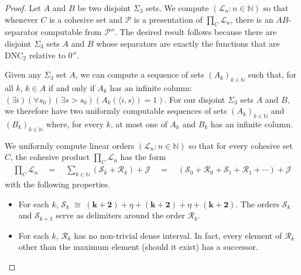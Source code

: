 \documentclass[11pt,a4paper,reqno]{amsart}
\theoremstyle{definition}
\newcommand{\dnc}{\mathrm{DNC}}
\newcommand{\la}{\langle}
\newcommand{\ra}{\rangle}
\newcommand{\iso}{\cong}
\newcommand{\Nb}{\mathbb{N}}
\newcommand{\mc}[1]{\mathcal{#1}}
\begin{document}
\begin{proof}
Let $A$ and $B$ be two disjoint $\Sigma_3$ sets.  We compute $(\mc{L}_n : n \in \Nb)$ so that whenever $C$ is a cohesive set and $\mc{P}$ is a presentation of $\prod_C \mc{L}_n$, there is an $AB$-separator computable from $\mc{P}''$.  The desired result follows because there are disjoint $\Sigma_3$ sets $A$ and $B$ whose separators are exactly the functions that are $\dnc_2$ relative to $0''$.

Given any $\Sigma_3$ set $A$, we can compute a sequence of sets $(A_k)_{k \in \Nb}$ such that, for all $k$, $k \in A$ if and only if $A_k$ has an infinite column: $(\exists i)(\forall s_0)(\exists s > s_0)(A_k(\la i, s \ra) = 1)$. 
For our disjoint $\Sigma_3$ sets $A$ and $B$, we therefore have two uniformly computable sequences of sets $(A_k)_{k \in \Nb}$ and $(B_k)_{k \in \Nb}$ where, for every $k$, at most one of $A_k$ and $B_k$ has an infinite column.

We uniformly compute linear orders $(\mc{L}_n : n \in \Nb)$ so that for every cohesive set $C$, the cohesive product $\prod_C \mc{L}_n$ has the form
\begin{align*}
\prod\nolimits_C \mc{L}_n \quad=\quad \sum_{k \in \Nb} (\mc{S}_k + \mc{R}_k) + \mc{J} \quad=\quad (\mc{S}_0 + \mc{R}_0 + \mc{S}_1 + \mc{R}_1 + \cdots) + \mc{J}
\end{align*}
with the following properties.

\begin{itemize}
\item For each $k$, $\mc{S}_k \;\iso\; (\bm{k+2}) + \eta + (\bm{k+2}) + \eta + (\bm{k+2})$.  The orders $\mc{S}_k$ and $\mc{S}_{k+1}$ serve as delimiters around the order $\mc{R}_k$.

\smallskip

\item For each $k$, $\mc{R}_k$ has no non-trivial dense interval.  In fact, every element of $\mc{R}_k$ other than the maximum element (should it exist) has a successor.

\smallskip


\end{itemize}
\end{proof}
\end{document}
